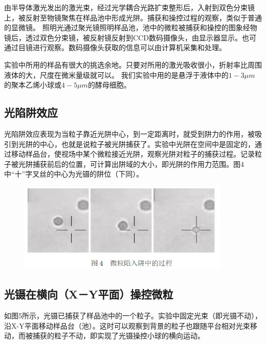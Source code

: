 \documentclass[a4paper,UTF8]{ctexart}
\begin{document}
由半导体激光发出的激光束，经过光学耦合光路扩束整形后，入射到双色分束镜上，被反射至物镜聚焦在样品池中形成光阱。捕获和操控过程的观察，类似于普通的显微镜。
照明光通过聚光镜照明样品池，池中的微粒被捕获和操控的图象经物镜后，透过双色分束镜，被反射镜反射到CCD数码摄像头，由显示器显示。也可通过目镜进行观察。数码摄像头获取的信息可以由计算机采集和处理。

实验中所用的样品有很大的挑选余地。只要对所用的激光吸收很小，折射率比周围液体的大，尺度在微米量级就可以。
我们实验中用的是悬浮于液体中的$1-3\mu m$的聚本乙烯小球或$4-5\mu m$的酵母细胞。

\subsection{光陷阱效应}

光陷阱效应表现为当粒子靠近光阱中心，到一定距离时，就受到阱力的作用，被吸引到光阱的中心，也就是说粒子被光阱捕获了。实验中光阱在空间中是固定的，通过移动样品台，使视场中某个微粒接近光阱，观察光阱对粒子的捕获过程。记录粒子被光阱捕获前后的位置，可计算出阱域的大小，即光阱的作用力范围。图4中“十”字叉丝的中心为光镊的阱位（下同）。

\begin{figure}[H]
    \centering
    \begin{minipage}[b]{0.9\textwidth}
        \centering
        \includegraphics[width=0.9\textwidth]{./fig4.jpg}
    \end{minipage}
\end{figure}

\subsection{光镊在横向（X－Y平面）操控微粒}

如图5所示，光镊已捕获了样品池中的一个粒子。实验中固定光束（即光镊不动），沿X-Y平面移动样品台（池）。这时可以观察到背景的粒子也跟随平台相对光束移动，而被捕获的粒子不动，即实现了光镊操控小球的横向运动。
\end{document}
